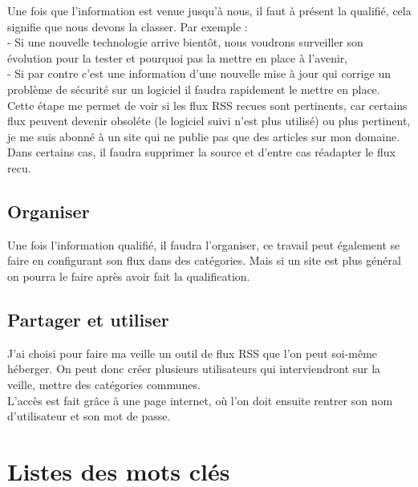 \documentclass[11pt,a4paper,oneside]{book}
\begin{document}
Une fois que l'information est venue jusqu'à nous, il faut à présent la qualifié, cela signifie que nous devons la classer.
Par exemple : \\
- Si une nouvelle technologie arrive bientôt, nous voudrons surveiller son évolution pour la tester et pourquoi pas la mettre en place à l'avenir, \\
- Si par contre c'est une information d'une nouvelle mise à jour qui corrige un problème de sécurité sur un logiciel il faudra rapidement le mettre en place. \\
Cette étape me permet de voir si les flux RSS recues sont pertinents, car certains flux peuvent devenir obsoléte (le logiciel suivi n'est plus utilisé) ou plus pertinent, je me suis abonné à un site qui ne publie pas que des articles sur mon domaine. \\
Dans certains cas, il faudra supprimer la source et d'entre cas réadapter le flux recu.

\subsection{Organiser}

Une fois l'information qualifié, il faudra l'organiser, ce travail peut également se faire en configurant son flux dans des catégories. Mais si un site est plus général on pourra le faire après avoir fait la qualification.

\subsection{Partager et utiliser}

J'ai choisi pour faire ma veille un outil de flux RSS que l'on peut soi-même héberger.
On peut donc créer plusieurs utilisateurs qui interviendront sur la veille, mettre des catégories communes. \\
L'accès est fait grâce à une page internet, où l'on doit ensuite rentrer son nom d'utilisateur et son mot de passe.

\section{Listes des mots clés}

\newpage
\end{document}

